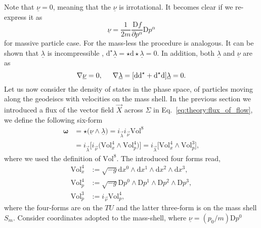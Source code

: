 %
Note that $\underline{\nu} = 0$, meaning that the $\underline{\nu}$ is irrotational. 
It becomes clear if we re-express it as 
%
\begin{equation}
\underline{\nu} = \frac{1}{2m}\frac{\text{D}f}{\partial p^{\alpha}}\text{D}p^{\alpha}
\end{equation} 
%
for massive particle case. For the mass-less the procedure is analogous. 
%
It can be shown that $\underline{\lambda}$ is incompressible \ie, 
$\text{d}^{\star}\underline{\lambda} =\star \text{d}\star\underline{\lambda} =0$. 
%
In addition, both $\underline{\lambda}$ and $\underline{\nu}$ are  as 
%
\begin{equation}
\nabla\underline{\nu} = 0 , \hspace{5mm}
\nabla\underline{\lambda} = [\text{dd}^{\star} + \text{d}^{\star}\text{d}]\underline{\lambda} = 0.
\end{equation}
%
Let us now consider the density of states in the phase space, of particles moving along the 
geodeiscs with velocities on the mass shell. 
In the previous section we introduced a flux of the vector field $\vec{X}$ across $\Sigma$ in 
Eq.~\eqref{eq:theory:flux_of_flow}, we define the following six-form
%
\begin{equation}
\begin{aligned}
\boldsymbol{\omega} &= \star\big(\underline{\nu}\wedge\underline{\lambda}\big) = i_{\vec{\lambda}} i_{\vec{\nu}}\text{Vol}^8 \\
&= i_{\vec{\lambda}}\Big[i_{\vec{\nu}}\big(\text{Vol}^{4}_{x}\wedge\text{Vol}^{4}_{p}\big)\Big] = i_{\vec{\lambda}} \big[\text{Vol}^{4}_{x}\wedge\text{Vol}^{3}_{p}\big],
\end{aligned}
\end{equation}
%
where we used the definition of $\text{Vol}^8$. 
The introduced four forms read,
%
\begin{equation}
\begin{aligned}
\text{Vol}_x ^4 &:= \sqrt{-g} \text{d}x^{0} \wedge \text{d}x^{1} \wedge \text{d}x^{2} \wedge \text{d}x^{3}, \\
\text{Vol}_p ^4 &:= \sqrt{-g} \text{D}p^{0} \wedge \text{D}p^{1} \wedge \text{D}p^{2} \wedge \text{D}p^{3}, \\
\text{Vol}_p ^3 &:= i_{\vec{\nu}}\text{Vol}_p ^4,
\end{aligned}
\end{equation}
%
where the four-forms are on the $TU$ and the latter three-form is on the mass shell $S_m$. 
%
Consider coordinates adopted to the mass-shell, where $\underline{\nu} = (p_0/m)\text{D}p^0$ 
